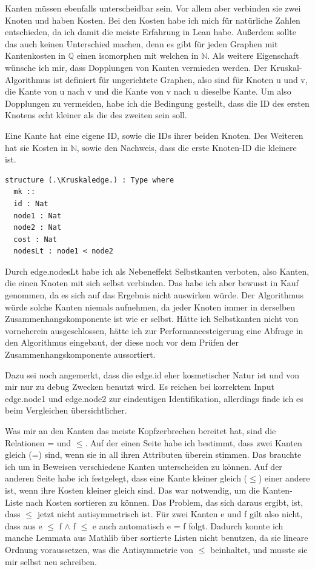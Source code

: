 Kanten müssen ebenfalls unterscheidbar sein.
Vor allem aber verbinden sie zwei Knoten und haben Kosten.
Bei den Kosten habe ich mich für natürliche Zahlen entschieden, da ich damit die meiste Erfahrung in Lean habe.
Außerdem sollte das auch keinen Unterschied machen, denn es gibt für jeden Graphen mit Kantenkosten in $\mathbb{Q}$ einen isomorphen mit welchen in $\mathbb{N}$.
Als weitere Eigenschaft wünsche ich mir, dass Dopplungen von Kanten vermieden werden.
Der Kruskal-Algorithmus ist definiert für ungerichtete Graphen, also sind für Knoten u und v, die Kante von u nach v und die Kante von v nach u dieselbe Kante.
Um also Dopplungen zu vermeiden, habe ich die Bedingung gestellt, dass die ID des ersten Knotens echt kleiner als die des zweiten sein soll.

\begin{definition}[\Kruskaledge]
  Eine Kante hat eine eigene ID, sowie die IDs ihrer beiden Knoten.
  Des Weiteren hat sie Kosten in $\mathbb{N}$,
  sowie den Nachweis, dass die erste Knoten-ID die kleinere ist.
\end{definition}
\begin{lstlisting}
structure (.\Kruskaledge.) : Type where
  mk ::
  id : Nat
  node1 : Nat
  node2 : Nat
  cost : Nat
  nodesLt : node1 < node2
\end{lstlisting}

Durch edge.nodesLt habe ich als Nebeneffekt Selbstkanten verboten, also Kanten, die einen Knoten mit sich selbst verbinden.
Das habe ich aber bewusst in Kauf genommen, da es sich auf das Ergebnis nicht auswirken würde.
Der Algorithmus würde solche Kanten niemals aufnehmen, da jeder Knoten immer in derselben Zusammenhangskomponente ist wie er selbst.
Hätte ich Selbstkanten nicht von vorneherein ausgeschlossen, hätte ich zur Performancesteigerung eine Abfrage in den Algorithmus eingebaut,
der diese noch vor dem Prüfen der Zusammenhangskomponente aussortiert.

Dazu sei noch angemerkt, dass die edge.id eher kosmetischer Natur ist und von mir nur zu debug Zwecken benutzt wird.
Es reichen bei korrektem Input edge.node1 und edge.node2 zur eindeutigen Identifikation, allerdings finde ich es beim Vergleichen übersichtlicher.

Was mir an den Kanten das meiste Kopfzerbrechen bereitet hat, sind die Relationen = und $\le$.
Auf der einen Seite habe ich bestimmt, dass zwei Kanten gleich (=) sind, wenn sie in all ihren Attributen überein stimmen.
Das brauchte ich um in Beweisen verschiedene Kanten unterscheiden zu können.
Auf der anderen Seite habe ich festgelegt, dass eine Kante kleiner gleich ($\le$) einer andere ist, wenn ihre Kosten kleiner gleich sind.
Das war notwendig, um die Kanten-Liste nach Kosten sortieren zu können.
Das Problem, das sich daraus ergibt, ist, dass $\le$ jetzt nicht antisymmetrisch ist.
Für zwei Kanten e und f gilt also nicht, dass aus e $\le$ f $\land$ f $\le$ e auch automatisch e = f folgt.
Dadurch konnte ich manche Lemmata aus Mathlib über sortierte Listen nicht benutzen, da sie lineare Ordnung voraussetzen, was die Antisymmetrie von $\le$ beinhaltet,
und musste sie mir selbst neu schreiben.

